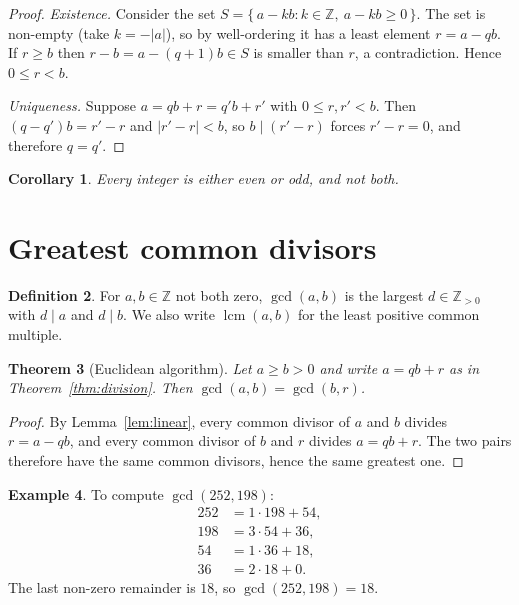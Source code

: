 \documentclass[11pt]{article}
\newtheorem{theorem}{Theorem}[section]
\newtheorem{corollary}[theorem]{Corollary}
\theoremstyle{definition}
\newtheorem{definition}[theorem]{Definition}
\newtheorem{example}[theorem]{Example}
\theoremstyle{remark}
\newcommand{\Z}{\mathbb{Z}}
\DeclareMathOperator{\lcm}{lcm}
\begin{document}
\begin{proof}
\emph{Existence.} Consider the set
$S = \{\, a - kb : k \in \Z,\ a - kb \ge 0 \,\}$. The set is non-empty
(take $k = -|a|$), so by well-ordering it has a least element $r = a - qb$.
If $r \ge b$ then $r - b = a - (q+1)b \in S$ is smaller than $r$, a
contradiction. Hence $0 \le r < b$.

\emph{Uniqueness.} Suppose $a = qb + r = q'b + r'$ with $0 \le r, r' < b$.
Then $(q - q')b = r' - r$ and $|r' - r| < b$, so $b \mid (r' - r)$ forces
$r' - r = 0$, and therefore $q = q'$.
\end{proof}

\begin{corollary}
Every integer is either even or odd, and not both.
\end{corollary}

\section{Greatest common divisors}

\begin{definition}
For $a, b \in \Z$ not both zero, $\gcd(a, b)$ is the largest $d \in \Z_{>0}$
with $d \mid a$ and $d \mid b$. We also write $\lcm(a,b)$ for the least
positive common multiple.
\end{definition}

\begin{theorem}[Euclidean algorithm]
Let $a \ge b > 0$ and write $a = qb + r$ as in Theorem~\ref{thm:division}.
Then $\gcd(a, b) = \gcd(b, r)$.
\end{theorem}

\begin{proof}
By Lemma~\ref{lem:linear}, every common divisor of $a$ and $b$ divides
$r = a - qb$, and every common divisor of $b$ and $r$ divides $a = qb + r$.
The two pairs therefore have the same common divisors, hence the same
greatest one.
\end{proof}

\begin{example}
To compute $\gcd(252, 198)$:
\begin{align*}
  252 &= 1 \cdot 198 + 54, \\
  198 &= 3 \cdot 54 + 36, \\
   54 &= 1 \cdot 36 + 18, \\
   36 &= 2 \cdot 18 + 0.
\end{align*}
The last non-zero remainder is $18$, so $\gcd(252, 198) = 18$.
\end{example}
\end{document}
